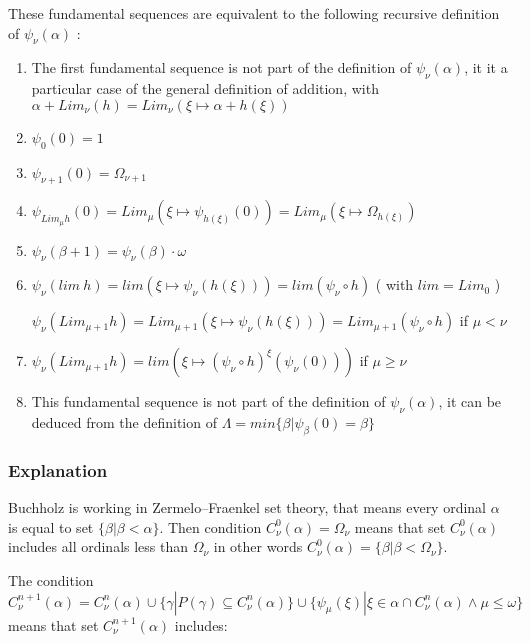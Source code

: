 \documentclass[10pt]{article}
\begin{document}
These fundamental sequences are equivalent to the following recursive definition of \( \psi_\nu(\alpha) \) :

\begin{enumerate}
     \setlength{\itemsep}{1pt}
     \setlength{\parskip}{0pt}
     \setlength{\parsep}{0pt}
\item The first fundamental sequence is not part of the definition of \( \psi_\nu(\alpha) \), it it a particular case of the general definition of addition, with \( \alpha + Lim_\nu(h) = Lim_\nu (\xi \mapsto \alpha + h(\xi)) \)
\item \( \psi_0(0) = 1 \)
\item \( \psi_{\nu+1}(0) = \Omega_{\nu+1} \) 
\item \( \psi_{Lim_\mu h}(0) = Lim_\mu (\xi \mapsto \psi_{h(\xi)}(0)) = Lim_\mu (\xi \mapsto \Omega_{h(\xi)}) \)
\item \( \psi_\nu(\beta+1) = \psi_\nu(\beta) \cdot \omega \)
\item \( \psi_\nu (lim\ h) = lim (\xi \mapsto \psi_\nu(h(\xi))) = lim (\psi_\nu \circ h) \) ( with \( lim = Lim_0 \) )

      \( \psi_\nu (Lim_{\mu+1} h) = Lim_{\mu+1} (\xi \mapsto \psi_\nu(h(\xi))) = Lim_{\mu+1} (\psi_\nu \circ h) \) if \( \mu < \nu \)
\item \( \psi_\nu (Lim_{\mu+1} h) = lim (\xi \mapsto (\psi_\nu \circ h)^\xi (\psi_\nu(0))) \) if \( \mu \ge \nu \)
\item This fundamental sequence is not part of the definition of \( \psi_\nu(\alpha) \), it can be deduced from the definition of \( \Lambda = min \lbrace \beta | \psi_\beta(0) = \beta \rbrace \)
\end{enumerate}


\subsubsection{Explanation}

Buchholz is working in Zermelo–Fraenkel set theory, that means every ordinal \(\alpha\) is equal to set \(\{\beta|\beta<\alpha\}\). Then condition \(C_\nu^0(\alpha)=\Omega_\nu\) means that set \(C_\nu^0(\alpha)\) includes all ordinals less than \(\Omega_\nu\) in other words \(C_\nu^0(\alpha)=\{\beta|\beta<\Omega_\nu\}\).

The condition \(C_\nu^{n+1}(\alpha) = C_\nu^n(\alpha) \cup \{\gamma | P(\gamma) \subseteq C_\nu^n(\alpha)\} \cup \{\psi_\mu(\xi) | \xi \in \alpha \cap C_\nu^n(\alpha) \wedge \mu \leq \omega\}\) means that set \(C_\nu^{n+1}(\alpha)\) includes:
\end{document}
